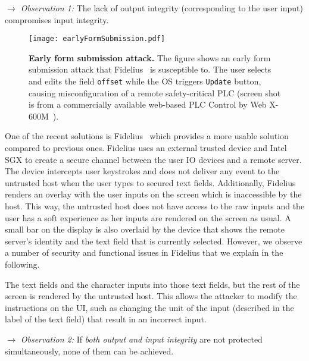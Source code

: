 \noindent\emph{$\rightarrow$ Observation 1:} The lack of output integrity (corresponding to the user input) compromises input integrity.

\begin{figure}[t]
\centering
\texttt{[image: earlyFormSubmission.pdf]} 
\caption{\textbf{Early form submission attack.} The figure shows an early form submission attack that Fidelius~\cite{Fidelius} is susceptible to. The user selects and edits the field \texttt{offset} while the OS triggers \texttt{Update} button, causing misconfiguration of a remote safety-critical PLC (screen shot is from a commercially available web-based PLC Control by Web X-600M~\cite{controlbyweb}).}
\spacesave
\label{fig:clickJack}
\centering 
\end{figure}


One of the recent solutions is Fidelius~\cite{Fidelius} which provides a more usable solution compared to previous ones. Fidelius uses an external trusted device and Intel SGX to create a secure channel between the user IO devices and a remote server. The device intercepts user keystrokes and does not deliver any event to the untrusted host when the user types to secured text fields. Additionally, Fidelius renders an overlay with the user inputs on the screen which is inaccessible by the host. This way, the untrusted host does not have access to the raw inputs and the user has a soft experience as her inputs are rendered on the screen as usual.
A small bar on the display is also overlaid by the device that shows the remote server's identity and the text field that is currently selected. 
However, we observe a number of security and functional issues in Fidelius that we explain in the following.

The text fields and the character inputs into those text fields, but the rest of the screen is rendered by the untrusted host.
This allows the attacker to modify the instructions on the UI, such as changing the unit of the input (described in the label of the text field) that result in an incorrect input.

 \noindent\emph{$\rightarrow$ Observation 2:} If \emph{both output and input integrity} are not protected simultaneously, none of them can be achieved. %

